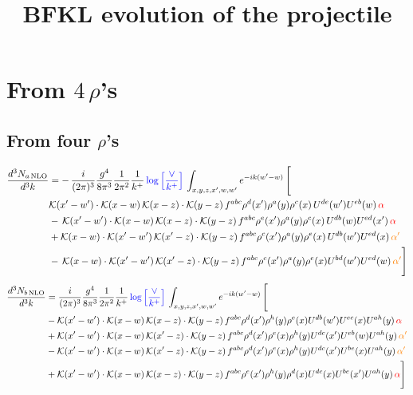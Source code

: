 \documentclass[9pt]{article}
\title{BFKL evolution of the projectile}
\author{}
\date{}
\numberwithin{equation}{section}
\begin{document}
\maketitle
\section{From $4$\,$\rho$'s}
\subsection{From four $\rho$'s}
\begin{align}
    \frac{d^{3}N_{a\,\rm NLO}}{d^{3}k} & = -\,\frac{i}{(2\pi)^{3}}\frac{g^{4}}{8\pi^{3}}\frac{1}{2\pi^{2}} \frac{1}{k^{+}}\,{\color{blue}\log{\left[\frac{\vee}{k^{+}}\right]}}\,\int_{x,y,z,x^{\prime},w,w^{\prime}}e^{-ik(w^{\prime}-w)}\, \Bigg[\notag \\ &  \mathcal{K}(x'-w')\cdot \mathcal{K}(x-w)\, \mathcal{K}(x-z)\cdot \mathcal{K}(y-z)\, f^{a b c} \rho^{d}(x') \rho^{a}(y) \rho^{c}(x)\,U^{d e}(w') U^{e b}(w)\, {\color{red} \alpha} \nonumber\\
    &  -\,\mathcal{K}(x'-w')\cdot \mathcal{K}(x-w)\, \mathcal{K}(x-z)\cdot \mathcal{K}(y-z)\, f^{a b c} \rho^{e}(x') \rho^{a}(y) \rho^{c}(x)\, U^{d b}(w) U^{e d}(x')\, {\color{red} \alpha}\nonumber\\
    & + \mathcal{K}(x-w)\cdot \mathcal{K}(x'-w')\, \mathcal{K}(x'-z)\cdot \mathcal{K}(y-z)\, f^{a b c} \rho^{c}(x') \rho^{a}(y) \rho^{e}(x)\,U^{d b}(w') U^{e d}(x)\, {\color{orange} \alpha'} \nonumber\\
    & -\,\mathcal{K}(x-w)\cdot \mathcal{K}(x'-w')\, \mathcal{K}(x'-z)\cdot \mathcal{K}(y-z)\, f^{a b c} \rho^{c}(x') \rho^{a}(y) \rho^{e}(x) U^{b d}(w') U^{e d}(w)\, {\color{orange} \alpha'}\Bigg]
\end{align}
\begin{align}
      \frac{d^{3}N_{b\,\rm NLO}}{d^{3}k} & = \frac{i}{(2\pi)^{3}}\frac{g^{4}}{8\pi^{3}}\frac{1}{2\pi^{2}} \frac{1}{k^{+}}\,{\color{blue}\log{\left[\frac{\vee}{k^{+}}\right]}}\,\int_{x,y,z,x^{\prime},w,w^{\prime}}e^{-ik(w^{\prime}-w)}\, \Bigg[\notag \\ & - \mathcal{K}(x'-w')\cdot \mathcal{K}(x-w)\, \mathcal{K}(x-z)\cdot \mathcal{K}(y-z)\, f^{a b c} \rho^{d}(x') \rho^{h}(y) \rho^{e}(x) U^{d b}(w') U^{e c}(x) U^{a h}(y)\, {\color{red} \alpha}\nonumber\\
    &+ \mathcal{K}(x'-w')\cdot \mathcal{K}(x-w)\,\mathcal{K}(x'-z)\cdot \mathcal{K}(y-z)\, f^{a b c} \rho^{d}(x') \rho^{e}(x) \rho^{h}(y) U^{d c}(x') U^{e b}(w) U^{a h}(y)\, {\color{orange} \alpha'}\nonumber\\
    &- \mathcal{K}(x'-w')\cdot \mathcal{K}(x-w)\,\mathcal{K}(x'-z)\cdot \mathcal{K}(y-z)\, f^{a b c} \rho^{d}(x') \rho^{e}(x) \rho^{h}(y) U^{d c}(x') U^{b e}(x) U^{a h}(y)\, {\color{orange} \alpha'}\nonumber\\
    &+  \mathcal{K}(x'-w')\cdot \mathcal{K}(x-w)\, \mathcal{K}(x-z)\cdot \mathcal{K}(y-z)\, f^{a b c} \rho^{e}(x') \rho^{h}(y) \rho^{d}(x) U^{d c}(x) U^{b e}(x') U^{a h}(y)\, {\color{red} \alpha} \Bigg]
\end{align}
\end{document}
